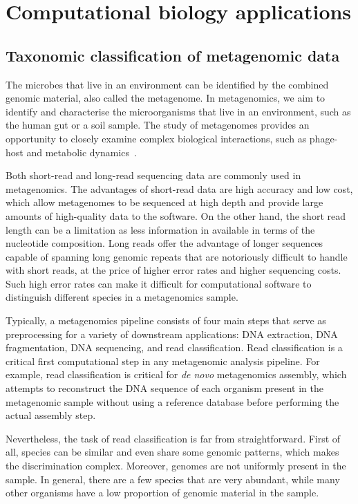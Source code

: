 
\section{Computational biology applications}


\subsection{Taxonomic classification of metagenomic data}

The microbes that live in an environment can be identified by the combined genomic material, also called the metagenome.
In metagenomics, we aim to identify and characterise the microorganisms that live in an environment, such as the human gut or a soil sample.
The study of metagenomes provides an opportunity to closely examine complex biological interactions, such as phage-host and metabolic dynamics~\cite{national2007new}.

Both short-read and long-read sequencing data are commonly used in metagenomics. 
The advantages of short-read data are high accuracy and low cost, which allow metagenomes to be sequenced at high depth and provide large amounts of high-quality data to the software.
On the other hand, the short read length can be a limitation  as less information in available in terms of the nucleotide composition.
Long reads offer the advantage of longer sequences capable of spanning long genomic repeats that are notoriously difficult to handle with short reads, at the price of higher error rates and higher sequencing costs.
Such high error rates can make it difficult for computational software to distinguish different species in a metagenomics sample.

Typically, a metagenomics pipeline consists of four main steps that serve as preprocessing for a variety of downstream applications: DNA extraction, DNA fragmentation, DNA sequencing, and read classification.
Read classification is a critical first computational step in any metagenomic analysis pipeline.
For example, read classification is critical for \emph{de novo} metagenomics assembly, which attempts to reconstruct the DNA sequence of each organism present in the metagenomic sample without using a reference database before performing the actual assembly step.

Nevertheless, the task of read classification is far from straightforward.
First of all, species can be similar and even share some genomic patterns, which makes the discrimination complex. 
Moreover, genomes are not uniformly present in the sample.
In general, there are a few species that are very abundant, while many other organisms have a low proportion of genomic material in the sample.


